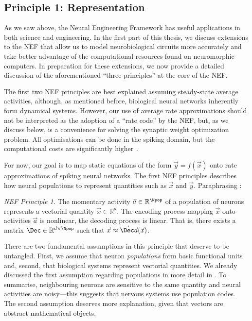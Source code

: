 \pagebreak

\subsection{Principle 1: Representation}

\label{sec:nef_representation}

As we saw above, the Neural Engineering Framework has useful applications in both science and engineering.
In the first part of this thesis, we discuss extensions to the NEF that allow us to model neurobiological circuits more accurately and take better advantage of the computational resources found on neuromorphic computers.
In preparation for these extensions, we now provide a detailed discussion of the aforementioned \enquote{three principles} at the core of the NEF.

The first two NEF principles are best explained assuming steady-state average activities, although, as mentioned before, biological neural networks inherently form dynamical systems.
However, our use of average rate approximations should not be interpreted as the adoption of a \enquote{rate code} by the NEF, but, as we discuss below, is a convenience for solving the synaptic weight optimization problem.
All optimisations can be done in the spiking domain, but the computational costs are significantly higher~\citep{macneil2011finetuning}.

For now, our goal is to map static equations of the form $\vec y = f(\vec x)$ onto rate approximations of spiking neural networks.
The first NEF principles describes how neural populations to represent quantities such as $\vec x$ and $\vec y$.
Paraphrasing \citet{eliasmith2003neural}:
\begin{framed}
\noindent\emph{NEF Principle 1.}
The momentary activity $\vec a \in \mathbb{R}^{\Npop}$ of a population of \Npop neurons represents a vectorial quantity $\vec x \in \mathbb{R}^d$. The encoding process mapping $\vec x$ onto activities $\vec a$ is nonlinear,	the decoding process is linear.
That is, there exists a matrix $\Dec \in \mathbb{R}^{d \times \Npop}$ such that $\vec x \approx \vec \Dec \vec a(\vec x)$.
\end{framed}
There are two fundamental assumptions in this principle that deserve to be untangled.
First, we assume that neuron \emph{populations} form basic functional units and, second, that biological systems represent vectorial quantities.
We already discussed the first assumption regarding populations in more detail in .
To summarise, neighbouring neurons are sensitive to the same quantity and neural activities are noisy---this suggests that nervous systems use population codes.
The second assumption deserves more explanation, given that vectors are abstract mathematical objects.

